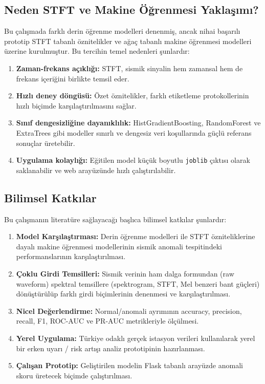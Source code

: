 \subsection{Neden STFT ve Makine Öğrenmesi Yaklaşımı?}

Bu çalışmada farklı derin öğrenme modelleri denenmiş, ancak nihai başarılı prototip STFT tabanlı öznitelikler ve ağaç tabanlı makine öğrenmesi modelleri üzerine kurulmuştur. Bu tercihin temel nedenleri şunlardır:

\begin{enumerate}
    \item \textbf{Zaman-frekans açıklığı:} STFT, sismik sinyalin hem zamansal hem de frekans içeriğini birlikte temsil eder.
    
    \item \textbf{Hızlı deney döngüsü:} Özet öznitelikler, farklı etiketleme protokollerinin hızlı biçimde karşılaştırılmasını sağlar.
    
    \item \textbf{Sınıf dengesizliğine dayanıklılık:} HistGradientBoosting, RandomForest ve ExtraTrees gibi modeller sınırlı ve dengesiz veri koşullarında güçlü referans sonuçlar üretebilir.
    
    \item \textbf{Uygulama kolaylığı:} Eğitilen model küçük boyutlu \texttt{joblib} çıktısı olarak saklanabilir ve web arayüzünde hızlı çalıştırılabilir.
\end{enumerate}

\subsection{Bilimsel Katkılar}

Bu çalışmanın literatüre sağlayacağı başlıca bilimsel katkılar şunlardır:

\begin{enumerate}
    \item \textbf{Model Karşılaştırması:} Derin öğrenme modelleri ile STFT özniteliklerine dayalı makine öğrenmesi modellerinin sismik anomali tespitindeki performanslarının karşılaştırılması.
    
    \item \textbf{Çoklu Girdi Temsilleri:} Sismik verinin ham dalga formundan (raw waveform) spektral temsillere (spektrogram, STFT, Mel benzeri bant güçleri) dönüştürülüp farklı girdi biçimlerinin denenmesi ve karşılaştırılması.
    
    \item \textbf{Nicel Değerlendirme:} Normal/anomali ayrımının accuracy, precision, recall, F1, ROC-AUC ve PR-AUC metrikleriyle ölçülmesi.
    
    \item \textbf{Yerel Uygulama:} Türkiye odaklı gerçek istasyon verileri kullanılarak yerel bir erken uyarı / risk artışı analiz prototipinin hazırlanması.
    
    \item \textbf{Çalışan Prototip:} Geliştirilen modelin Flask tabanlı arayüzde anomali skoru üretecek biçimde çalıştırılması.
\end{enumerate}


